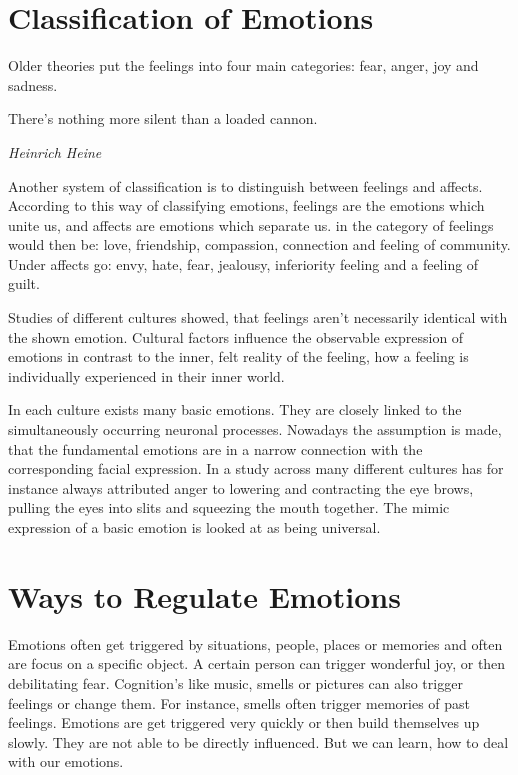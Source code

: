 \documentclass[../main.tex]{subfiles}
\begin{document}
\section{Classification of Emotions}

Older theories put the feelings into four main categories: fear, anger, joy and sadness.

\epigraph{There's nothing more silent than a loaded cannon.}{\textit{Heinrich Heine}}

Another system of classification is to distinguish between feelings and affects.
According to this way of classifying emotions, feelings are the emotions which unite us, and affects are emotions which separate us.
in the category of feelings would then be: love, friendship, compassion, connection and feeling of community.
Under affects go: envy, hate, fear, jealousy, inferiority feeling and a feeling of guilt.

Studies of different cultures showed, that feelings aren't necessarily identical with the shown emotion.
Cultural factors influence the observable expression of emotions in contrast to the inner, felt reality of the feeling,
how a feeling is individually experienced in their inner world.

In each culture exists many basic emotions.
They are closely linked to the simultaneously occurring neuronal processes.
Nowadays the assumption is made, that the fundamental emotions are in a narrow connection with the corresponding facial expression.
In a study across many different cultures has for instance always attributed anger to lowering and contracting the eye brows,
pulling the eyes into slits and squeezing the mouth together.
The mimic expression of a basic emotion is looked at as being universal.

\section{Ways to Regulate Emotions}

Emotions often get triggered by situations, people, places or memories and often are focus on a specific object.
A certain person can trigger wonderful joy, or then debilitating fear.
Cognition's like music, smells or pictures can also trigger feelings or change them.
For instance, smells often trigger memories of past feelings.
Emotions are get triggered very quickly or then build themselves up slowly.
They are not able to be directly influenced.
But we can learn, how to deal with our emotions.
\end{document}
